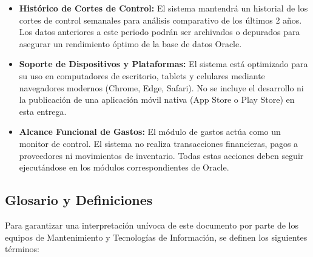 \documentclass[11pt, letterpaper]{article}
\begin{document}
\begin{itemize}
    \item \textbf{Histórico de Cortes de Control:} El sistema mantendrá un historial de los cortes de control semanales para análisis comparativo de los últimos 2 años. Los datos anteriores a este periodo podrán ser archivados o depurados para asegurar un rendimiento óptimo de la base de datos Oracle.
    
    \item \textbf{Soporte de Dispositivos y Plataformas:} El sistema está optimizado para su uso en computadores de escritorio, tablets y celulares mediante navegadores modernos (Chrome, Edge, Safari). No se incluye el desarrollo ni la publicación de una aplicación móvil nativa (App Store o Play Store) en esta entrega.
    
    \item \textbf{Alcance Funcional de Gastos:} El módulo de gastos actúa como un monitor de control. El sistema no realiza transacciones financieras, pagos a proveedores ni movimientos de inventario. Todas estas acciones deben seguir ejecutándose en los módulos correspondientes de Oracle.
\end{itemize}

\subsection{Glosario y Definiciones}

Para garantizar una interpretación unívoca de este documento por parte de los equipos de Mantenimiento y Tecnologías de Información, se definen los siguientes términos:
\end{document}

